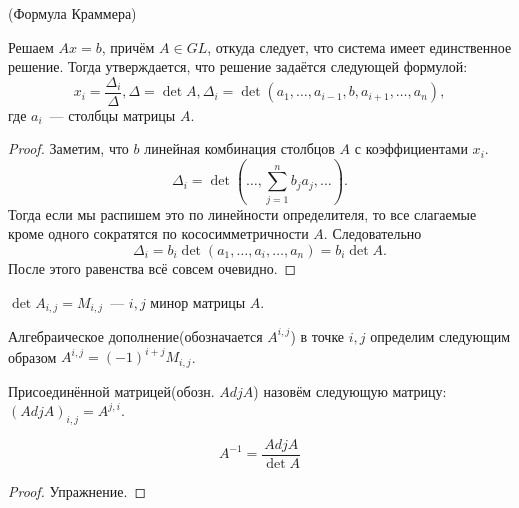 \begin{follow}
     (Формула Краммера)

     Решаем $Ax = b$, причём $A\in GL$, откуда следует, что система имеет единственное решение.
     Тогда утверждается, что решение задаётся следующей формулой:
    \[
        x_i = \frac{\Delta_i}{\Delta}, \Delta = \det A, 
        \Delta_i = \det\left(a_1, \dots, a_{i-1}, b, a_{i+1},\dots, a_n\right)   
    ,\] где $a_i$~--- столбцы матрицы $A$.
\end{follow}
\begin{proof}
    Заметим, что $b$ линейная комбинация столбцов $A$ с коэффициентами $x_i$.
    \[
        \Delta_i = \det\left(\dots, \sum\limits_{j=1}^{n}{b_ja_j}, \dots\right)
    .\]
    Тогда если мы распишем это по линейности определителя, то все слагаемые 
    кроме одного сократятся по кососимметричности $A$. Следовательно
    \[
        \Delta_i = b_i\det\left(a_1,\dots,a_i,\dots, a_n\right) = b_i\det A
    .\]
    После этого равенства всё совсем очевидно. 
\end{proof}
\begin{definition}
    $\det A_{i,j} = M_{i,j}$~--- $i,j$ минор матрицы $A$.
\end{definition}
\begin{definition}
    Алгебраическое дополнение(обозначается $A^{i,j}$) в точке $i, j$ определим следующим
    образом $A^{i,j} = (-1)^{i + j}M_{i,j}$. 
\end{definition}
\begin{definition}
    Присоединённой матрицей(обозн. $Adj A$) назовём следующую матрицу:\\ $(Adj A)_{i,j} = A^{j,i}$.
\end{definition}
\begin{statement}
    \[
        A^{-1} = \frac{AdjA}{\det A}
    \]
\end{statement}
\begin{proof}
    Упражнение.
\end{proof}
